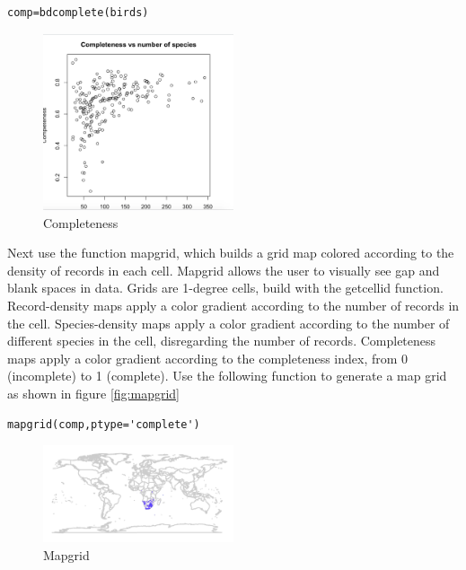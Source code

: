 \begin{lstlisting}
comp=bdcomplete(birds)
\end{lstlisting}

\begin{figure}[htbp!]
   \centering
   \includegraphics[width=0.5\textwidth]{pictures/biodiversity/complete.jpg} 
      \caption{Completeness}
   \label{fig:completeness}
\end{figure} 

Next use the function mapgrid, which builds a grid map colored according to the density of records in each cell.
Mapgrid allows the user to visually see gap and blank spaces in data.
Grids are 1-degree cells, build with the getcellid function.
Record-density maps apply a color gradient according to the number of records in the cell.
Species-density maps apply a color gradient according to the number of different species in the cell, disregarding the number of records.
Completeness maps apply a color gradient according to the completeness index, from 0 (incomplete) to 1 (complete).
Use the following function to generate a map grid as shown in figure \ref{fig:mapgrid}

\begin{lstlisting}
mapgrid(comp,ptype='complete')
\end{lstlisting}

\begin{figure}[htbp!]
   \centering
   \includegraphics[width=0.5\textwidth]{pictures/biodiversity/map.jpg} 
      \caption{Mapgrid}
   \label{fig:Mapgrid}
\end{figure} 


